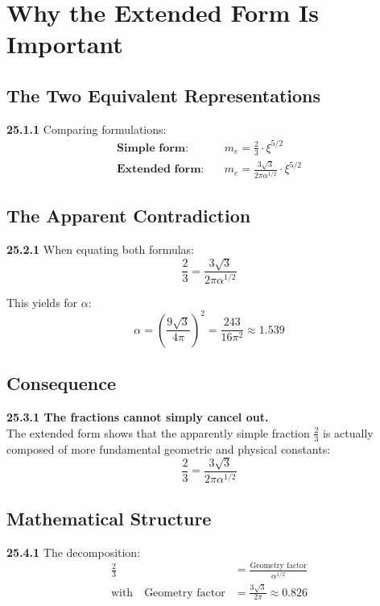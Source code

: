 \section{Why the Extended Form Is Important}

\subsection{The Two Equivalent Representations}

\noindent \textbf{25.1.1} Comparing formulations:
\begin{align*}
	\textbf{Simple form:} &\quad m_e = \frac{2}{3} \cdot \xi^{5/2} \\
	\textbf{Extended form:} &\quad m_e = \frac{3\sqrt{3}}{2\pi\alpha^{1/2}} \cdot \xi^{5/2}
\end{align*}

\subsection{The Apparent Contradiction}

\noindent \textbf{25.2.1} When equating both formulas:
\[
\frac{2}{3} = \frac{3\sqrt{3}}{2\pi\alpha^{1/2}}
\]

This yields for $\alpha$:
\[
\alpha = \left(\frac{9\sqrt{3}}{4\pi}\right)^2 = \frac{243}{16\pi^2} \approx 1.539
\]

\subsection{Consequence}

\begin{tcolorbox}[colback=red!5!white,colframe=red!75!black]
	\textbf{25.3.1 The fractions cannot simply cancel out.}
	\\
	The extended form shows that the apparently simple fraction $\frac{2}{3}$ is actually composed of more fundamental geometric and physical constants:
	\[
	\frac{2}{3} = \frac{3\sqrt{3}}{2\pi\alpha^{1/2}}
	\]
\end{tcolorbox}

\subsection{Mathematical Structure}

\noindent \textbf{25.4.1} The decomposition:
\begin{align*}
	\frac{2}{3} &= \frac{\text{Geometry factor}}{\alpha^{1/2}} \\
	\text{with} \quad \text{Geometry factor} &= \frac{3\sqrt{3}}{2\pi} \approx 0.826
\end{align*}

